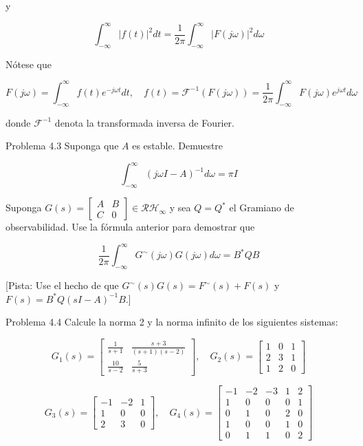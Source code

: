 y

$$
\int_{-\infty}^{\infty}|f(t)|^{2} d t=\frac{1}{2 \pi} \int_{-\infty}^{\infty}|F(j \omega)|^{2} d \omega
$$

Nótese que

$$
F(j \omega)=\int_{-\infty}^{\infty} f(t) e^{-j \omega t} d t, \quad f(t)=\mathcal{F}^{-1}(F(j \omega))=\frac{1}{2 \pi} \int_{-\infty}^{\infty} F(j \omega) e^{j \omega t} d \omega
$$

donde $\mathcal{F}^{-1}$ denota la transformada inversa de Fourier.

Problema 4.3 Suponga que $A$ es estable. Demuestre

$$
\int_{-\infty}^{\infty}(j \omega I-A)^{-1} d \omega=\pi I
$$

Suponga $G(s)=\left[\begin{array}{c|c}A & B \\ \hline C & 0\end{array}\right] \in \mathcal{R} \mathcal{H}_{\infty}$ y sea $Q=Q^{*}$ el Gramiano de observabilidad. Use la fórmula anterior para demostrar que

$$
\frac{1}{2 \pi} \int_{-\infty}^{\infty} G^{\sim}(j \omega) G(j \omega) d \omega=B^{*} Q B
$$

[Pista: Use el hecho de que $G^{\sim}(s) G(s)=F^{\sim}(s)+F(s)$ y $F(s)=B^{*} Q(s I-A)^{-1} B$.]

Problema 4.4 Calcule la norma 2 y la norma infinito de los siguientes sistemas:

$$
G_{1}(s)=\left[\begin{array}{cc}
\frac{1}{s+1} & \frac{s+3}{(s+1)(s-2)} \\
\frac{10}{s-2} & \frac{5}{s+3}
\end{array}\right], \quad G_{2}(s)=\left[\begin{array}{ll|l}
1 & 0 & 1 \\
2 & 3 & 1 \\
\hline 1 & 2 & 0
\end{array}\right]
$$

$$
G_{3}(s)=\left[\begin{array}{cc|c}
-1 & -2 & 1 \\
1 & 0 & 0 \\
\hline 2 & 3 & 0
\end{array}\right], \quad G_{4}(s)=\left[\begin{array}{ccc|cc}
-1 & -2 & -3 & 1 & 2 \\
1 & 0 & 0 & 0 & 1 \\
0 & 1 & 0 & 2 & 0 \\
\hline 1 & 0 & 0 & 1 & 0 \\
0 & 1 & 1 & 0 & 2
\end{array}\right]
$$

